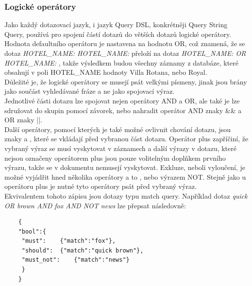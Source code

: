\documentclass[czech,BP]{thesiskiv}
\begin{document}
\subsubsection{Logické operátory}
Jako každý dotazovací jazyk, i jazyk Query DSL, konkrétněji Query String Query, používá pro spojení částí dotazů do větších dotazů logické operátory. Hodnota defaultního operátoru je nastavena na hodnotu OR, což znamená, že se dotaz\textit{ HOTEL\_NAME:  HOTEL\_NAME:  } přeloží na dotaz \textit{HOTEL\_NAME:  OR HOTEL\_NAME:  }, takže výsledkem budou všechny záznamy z databáze, které obsahují v poli HOTEL\_NAME hodnoty Villa Rotana, nebo Royal.
\\
Důležité je, že logické operátory se musejí psát velkými písmeny, jinak jsou brány jako součást vyhledávané fráze a ne jako spojovací výraz.
\\
Jednotlivé části dotazu lze spojovat nejen operátory AND a OR, ale také je lze sdružovat do skupin pomocí závorek, nebo nahradit operátor AND znaky \&\& a OR znaky ||.
\\
Další operátory, pomocí kterých je také možné ovlivnit chování dotazu, jsou znaky \uv{+} a \uv{-}, které se vkládají před vybranou část dotazu. Operátor plus zapříčiní, že vybraný výraz se musí vyskytovat v záznamech a další výrazy v dotazu, které nejsou označeny operátorem plus jsou pouze volitelným doplňkem prvního výrazu, takže se v dokumentu nemusejí vyskytovat. Exkluze, neboli vyloučení, je možné vyjádřit hned několika operátory a to \uv{-}, \uv{!} nebo výrazem NOT. Stejně jako u operátoru plus je nutné tyto operátory psát před vybraný výraz.
\\
Ekvivalentem tohoto zápisu jsou dotazy typu match query. Například dotaz \textit{quick OR brown AND fox AND NOT news} lze přepsat následovně:
			

	\begin{lstlisting}
	{
	"bool":{
	 "must":	{"match":"fox"},
	 "should":	{"match":"quick brown"},
	 "must_not":	{"match":"news"}
	 }
	}
	\end{lstlisting}
\end{document}
